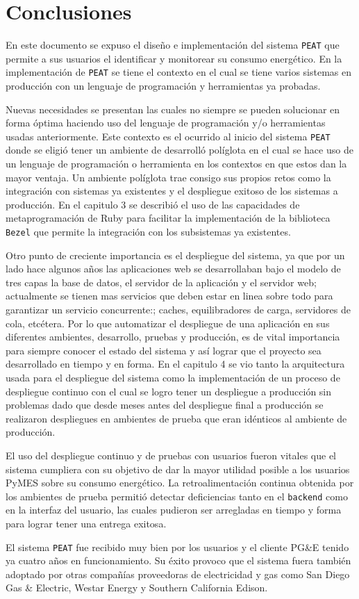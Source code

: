 \chapter{Conclusiones}

En este documento se expuso el diseño e implementación del sistema \texttt{PEAT} que
permite a sus usuarios el identificar y monitorear su consumo energético. En la
implementación de \texttt{PEAT} se tiene el contexto en el cual se tiene varios
sistemas en producción con un lenguaje de programación y herramientas ya
probadas.

Nuevas necesidades se presentan las cuales no siempre se pueden solucionar en
forma óptima haciendo uso del lenguaje de programación y/o herramientas usadas
anteriormente. Este contexto es el ocurrido al inicio del sistema \texttt{PEAT}
donde se eligió tener un ambiente de desarrolló políglota en el cual se hace uso
de un lenguaje de programación o herramienta en los contextos en que estos dan la
mayor ventaja. Un ambiente políglota trae consigo sus propios retos como la
integración con sistemas ya existentes y el despliegue exitoso de los sistemas a
producción. En el capitulo 3 se describió el uso de las capacidades de
metaprogramación de Ruby para facilitar la implementación de la biblioteca
\texttt{Bezel} que permite la integración con los subsistemas ya existentes.

Otro punto de creciente importancia es el despliegue del sistema, ya que por
un lado hace algunos años las aplicaciones web se desarrollaban bajo el modelo
de tres capas la base de datos, el servidor de la aplicación y el servidor web;
actualmente se tienen mas servicios que deben estar en linea sobre todo para
garantizar un servicio concurrente:; caches, equilibradores de carga, servidores
de cola, etcétera. Por lo que automatizar el despliegue de una aplicación en sus
diferentes ambientes, desarrollo, pruebas y producción, es de vital importancia
para siempre conocer el estado del sistema y así lograr que el proyecto sea
desarrollado en tiempo y en forma. En el capitulo 4 se vio tanto la arquitectura
usada para el despliegue del sistema como la implementación de un proceso
de despliegue continuo con el cual se logro tener un despliegue a producción sin
problemas dado que desde meses antes del despliegue final a producción se
realizaron despliegues en ambientes de prueba que eran idénticos al ambiente de
producción.

El uso del despliegue continuo y de pruebas con usuarios fueron vitales
que el sistema cumpliera con su objetivo de dar la mayor utilidad posible
a los usuarios PyMES sobre su consumo energético. La retroalimentación continua
obtenida por los ambientes de prueba permitió detectar deficiencias tanto en el
\texttt{backend} como en la interfaz del usuario, las cuales pudieron ser arregladas
en tiempo y forma para lograr tener una entrega exitosa.

El sistema \texttt{PEAT} fue recibido muy bien por los usuarios y el cliente PG\&E
tenido ya cuatro años en funcionamiento. Su éxito provoco que el sistema fuera
también adoptado por otras compañías proveedoras de electricidad y gas como
San Diego Gas \& Electric, Westar Energy y Southern California Edison.

